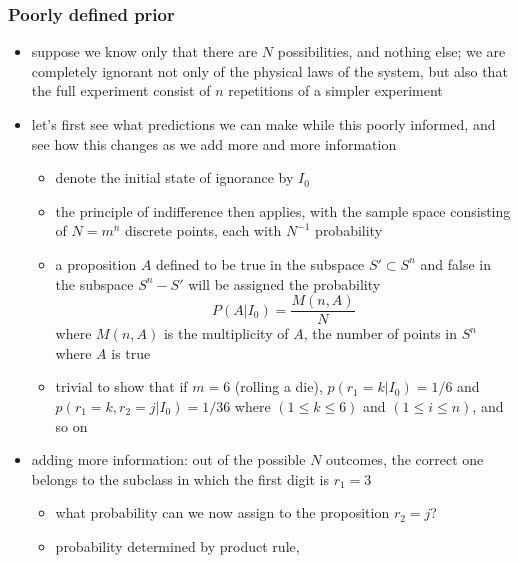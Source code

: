 \documentclass[../jaynes_prob_theory_notes.tex]{subfiles}
\begin{document}
            \subsubsection{Poorly defined prior}
                \begin{itemize}
                    \item suppose we know only that there are $N$ possibilities, and nothing else; we are completely ignorant not only of the physical laws of the system, but also that the full experiment consist of $n$ repetitions of a simpler experiment
                    \item let's first see what predictions we can make while this poorly informed, and see how this changes as we add more and more information
                        \begin{itemize}
                            \item denote the initial state of ignorance by $I_0$
                            \item the principle of indifference then applies, with the sample space consisting of $N=m^n$ discrete points, each with $N^{-1}$ probability
                            \item a proposition $A$ defined to be true in the subspace $S' \subset S^n$ and false in the subspace $S^n - S'$ will be assigned the probability
                                \begin{equation*}
                                    P(A|I_0) = \frac{M(n,A)}{N} 
                                \end{equation*}
                                where $M(n,A)$ is the multiplicity of $A$, the number of points in $S^n$ where $A$ is true
                            \item trivial to show that if $m=6$ (rolling a die), $p(r_1 = k|I_0)=1/6$ and $p(r_1=k, r_2=j|I_0)=1/36$ where $(1 \leq k \leq 6)$ and $(1 \leq i \leq n)$, and so on
                        \end{itemize}
                    \item adding more information: out of the possible $N$ outcomes, the correct one belongs to the subclass in which the first digit is $r_1 = 3$
                        \begin{itemize}
                            \item what probability can we now assign to the proposition $r_2 = j$?
                            \item probability determined by product rule,

\end{itemize}
\end{itemize}
\end{document}
